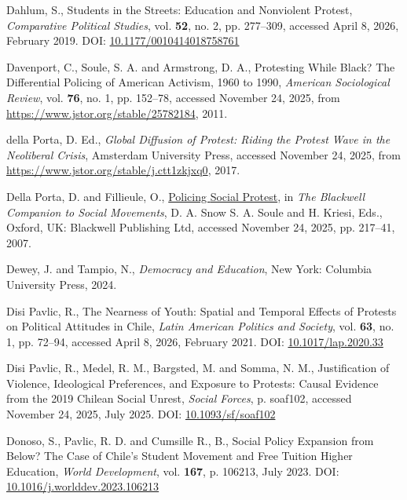 \documentclass[
  13pt,
]{article}
\newlength{\cslhangindent}
\newenvironment{CSLReferences}[2] %
 {\begin{list}{}{%
  \setlength{\itemindent}{0pt}
  \setlength{\leftmargin}{0pt}
  \setlength{\parsep}{0pt}
  \ifodd #1
   \setlength{\leftmargin}{\cslhangindent}
   \setlength{\itemindent}{-1\cslhangindent}
  \fi
  \setlength{\itemsep}{#2\baselineskip}}}
 {\end{list}}
\begin{document}
\begin{CSLReferences}{1}{0}
Dahlum, S., Students in the {Streets}: {Education} and {Nonviolent
Protest}, \emph{Comparative Political Studies}, vol. \textbf{52}, no. 2,
pp. 277--309, accessed April 8, 2026, February 2019. DOI:
\href{https://doi.org/10.1177/0010414018758761}{10.1177/0010414018758761}

Davenport, C., Soule, S. A. and Armstrong, D. A., Protesting {While
Black}? {The Differential Policing} of {American Activism}, 1960 to
1990, \emph{American Sociological Review}, vol. \textbf{76}, no. 1, pp.
152--78, accessed November 24, 2025, from
\url{https://www.jstor.org/stable/25782184}, 2011.

{della Porta, D. Ed.}, \emph{Global {Diffusion} of {Protest}: {Riding}
the {Protest Wave} in the {Neoliberal Crisis}}, Amsterdam University
Press, accessed November 24, 2025, from
\url{https://www.jstor.org/stable/j.ctt1zkjxq0}, 2017.

Della Porta, D. and Fillieule, O.,
\href{https://doi.org/10.1002/9780470999103.ch10}{Policing {Social
Protest}}, in \emph{The {Blackwell Companion} to {Social Movements}}, D.
A. Snow S. A. Soule and H. Kriesi, Eds., Oxford, UK: Blackwell
Publishing Ltd, accessed November 24, 2025, pp. 217--41, 2007.

Dewey, J. and Tampio, N., \emph{Democracy and Education}, New York:
Columbia University Press, 2024.

Disi Pavlic, R., The {Nearness} of {Youth}: {Spatial} and {Temporal
Effects} of {Protests} on {Political Attitudes} in {Chile}, \emph{Latin
American Politics and Society}, vol. \textbf{63}, no. 1, pp. 72--94,
accessed April 8, 2026, February 2021. DOI:
\href{https://doi.org/10.1017/lap.2020.33}{10.1017/lap.2020.33}

Disi Pavlic, R., Medel, R. M., Bargsted, M. and Somma, N. M.,
Justification of Violence, Ideological Preferences, and Exposure to
Protests: Causal Evidence from the 2019 {Chilean} Social Unrest,
\emph{Social Forces}, p. soaf102, accessed November 24, 2025, July 2025.
DOI: \href{https://doi.org/10.1093/sf/soaf102}{10.1093/sf/soaf102}

Donoso, S., Pavlic, R. D. and Cumsille R., B., Social Policy Expansion
from Below? {The} Case of {Chile}'s Student Movement and Free Tuition
Higher Education, \emph{World Development}, vol. \textbf{167}, p.
106213, July 2023. DOI:
\href{https://doi.org/10.1016/j.worlddev.2023.106213}{10.1016/j.worlddev.2023.106213}


\end{CSLReferences}
\end{document}

